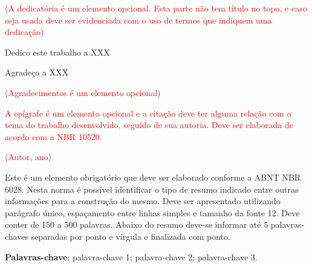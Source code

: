 \documentclass[
	12pt,				%
	openright,			%
	oneside,			%
	a4paper,			%
	english,			%
	french,				%
	spanish,			%
	brazil				%
	]{abntex2UFMT}
\begin{document}
\begin{dedicatoria}

   \vspace*{\fill}
   \centering
   \noindent\textcolor{red}{(A dedicatória é um elemento opcional. Esta parte não tem título no topo, e caso seja usada deve ser evidenciada com o uso de termos que indiquem uma dedicação)}
   \vspace*{\fill}
   
    \begin{flushright}
    Dedico este trabalho a XXX
    \par\end{flushright}
    
\end{dedicatoria}

\begin{agradecimentos}
Agradeço a XXX

   \vspace*{\fill}
   \centering
   \noindent\textcolor{red}{(Agradecimentos é um elemento opcional)}
   \vspace*{\fill}

\end{agradecimentos}

\begin{epigrafe}
    \vspace*{\fill}

	\noindent\textcolor{red}{A epígrafe é um elemento opcional e a citação deve ter alguma relação com o tema do trabalho desenvolvido, seguido de sua autoria. Deve ser elaborada de acordo com a NBR 10520.}
    \begin{flushright}
    \noindent\textcolor{red}{(Autor, ano)}
	\end{flushright}
\end{epigrafe}


\setlength{\absparsep}{18pt} %
\begin{resumo}
Este é um elemento obrigatório que deve ser elaborado conforme a ABNT NBR 6028. Nesta norma é possível identificar o tipo de resumo indicado entre outras informações para a construção do mesmo. Deve ser apresentado utilizando parágrafo único, espaçamento entre linhas simples e tamanho da fonte 12. Deve conter de 150 a 500 palavras. Abaixo do resumo deve-se informar até 5 palavras-chaves separadas por ponto e vírgula e finalizada com ponto. 

 \textbf{Palavras-chave}: palavra-chave 1; palavra-chave 2; palavra-chave 3.
\end{resumo}
\end{document}
